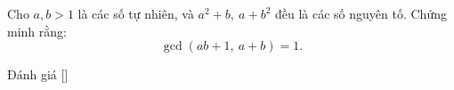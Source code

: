 \ifshowproblem
\begin{problem}\label{problem:RUS-2015-SMO-11-P2}
    Cho \( a, b > 1 \) là các số tự nhiên, và \( a^2 + b,\ a + b^2 \) đều là các số nguyên tố.  
    Chứng minh rằng:
    \[
        \gcd(ab + 1,\ a + b) = 1.
    \]
\end{problem}
\fi

\ifshowinfo
Đánh giá [\textbf{}]\footnotemark
{}
\fi